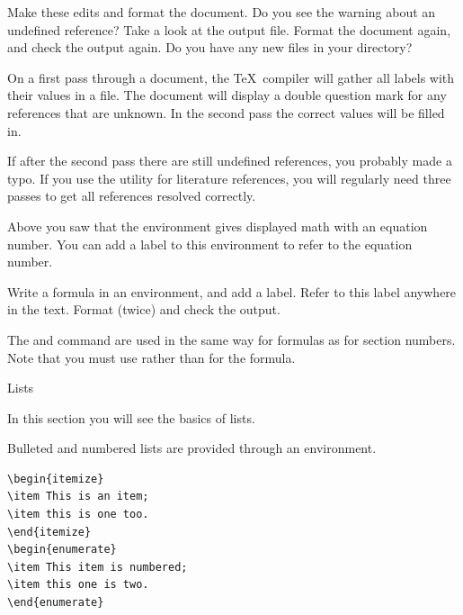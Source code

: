 \begin{exercise}
Make these edits and format the document. Do
you see the warning about an undefined reference? Take a look at the
output file. Format the document
again, and check the output again.
Do you have any new files in your directory?
\end{exercise}
\begin{outcome}
{On a first pass through a document, the \TeX\ compiler will gather
all labels with their values in a  file. The document will
display a double question mark for any references that are
unknown. In the second pass the correct values will be filled
in.}
\end{outcome}
\begin{caution}
{If after the second pass there are still undefined references, you
probably made a typo. If you use the  utility for
literature references, you will regularly need three passes to get
all references resolved correctly.}
\end{caution}

Above you saw that the  environment gives displayed
math with an equation number. You can add a label to this environment
to refer to the equation number.

\begin{exercise}
Write a formula in an 
environment, and add a label.  Refer to this label anywhere in the
text. Format (twice) and check the output.
\end{exercise}
\begin{outcome}
{The \n{\\label} and \n{\\ref} command are used in the same way for
formulas as for section numbers. Note that you must use
 rather than \n{\\[...\\]} for the formula.}
\end{outcome}

 {Lists}

\begin{purpose}
  In this section you will see the basics of lists.
\end{purpose}

Bulleted and numbered lists are provided through an environment.
\begin{verbatim}
\begin{itemize}
\item This is an item;
\item this is one too.
\end{itemize}
\begin{enumerate}
\item This item is numbered;
\item this one is two.
\end{enumerate}
\end{verbatim}

